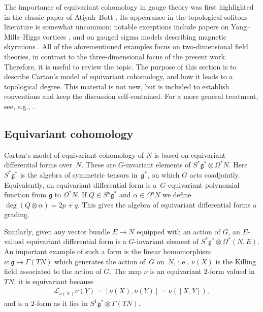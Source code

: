 \documentclass[10pt,a4paper]{amsart}
\newcommand{\LL}{{\mathcal{L}}}
\newcommand{\g}{{\mathfrak{g}}}
\newcommand{\1}{{\mathbb{1}}}
\numberwithin{equation}{section}
\begin{document}
The importance of equivariant cohomology in gauge theory was first highlighted in the classic paper of Atiyah--Bott \cite{atiyahbott1983YMriem}. Its appearance in the topological solitons literature is somewhat uncommon; notable exceptions include papers on Yang--Mills--Higgs vortices \cite{CieliebakGaioMundetIRieraSalamon2002symplectic,mundet1999yang,SpeightRomao2020}, and on gauged sigma models describing magnetic skyrmions \cite{walton2020geometry}. All of the aforementioned examples focus on two-dimensional field theories, in contrast to the three-dimensional focus of the present work. Therefore, it is useful to review the topic. The purpose of this section is to describe Cartan's model of equivariant cohomology, and how it leads to a topological degree. This material is not new, but is included to establish conventions and keep the discussion self-contained. For a more general treatment, see, e.g., \cite{atiyahbott1984moment,berlineGetzlerVergne2003}.

\subsection{Equivariant cohomology}
Cartan's model of equivariant cohomology of $N$ is based on {equivariant differential forms} over~$N$. These are $G$-invariant elements of $S^\ast \mathfrak{g}^\ast\otimes \Omega^\ast N$. Here $S^\ast\mathfrak{g}^\ast$ is the algebra of symmetric tensors in~$\mathfrak{g}^\ast$, on which $G$ acts coadjointly. Equivalently, an equivariant differential form is a~$G$-equi\-vari\-ant polynomial function from $\mathfrak{g}$ to $\Omega^\ast N$. If $Q\in S^p\g^\ast$ and $\alpha\in\Omega^qN$ we define $\deg(Q\otimes \alpha)=2p+q$. This gives the algebra of equivariant differential forms a grading.

Similarly, given any vector bundle $E\to N$ equipped with an action of $G$, an $E$-valued equivariant differential form is a $G$-invariant element of $S^\ast\g^\ast\otimes\Omega^\ast(N,E)$. An important example of such a form is the linear homomorphism $\nu\colon \g\to \Gamma(TN)$ which generates the action of~$G$ on~$N$, i.e., $\nu(X)$ is the Killing field associated to the action of $G$. The map $\nu$ is an equivariant $2$-form valued in $TN$; it is equivariant because
\begin{align*}
 \LL_{\nu(X)}\nu(Y)=[\nu(X),\nu(Y)]=\nu([X,Y]),
\end{align*}
and is a $2$-form as it lies in $S^1\g^\ast\otimes\Gamma(TN)$.
\end{document}
